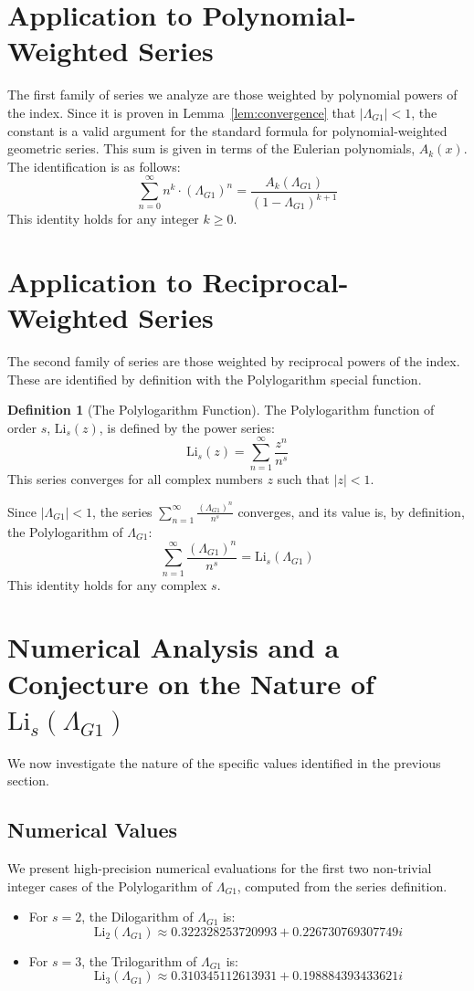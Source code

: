 \documentclass{amsart}
\theoremstyle{plain}
\theoremstyle{definition}
\newtheorem{definition}[theorem]{Definition}
\theoremstyle{remark}
\newcommand{\LambdaG}{\Lambda_{G1}}
\begin{document}
\section{Application to Polynomial-Weighted Series}
The first family of series we analyze are those weighted by polynomial powers of the index. Since it is proven in Lemma~\ref{lem:convergence} that $|\LambdaG|<1$, the constant is a valid argument for the standard formula for polynomial-weighted geometric series. This sum is given in terms of the Eulerian polynomials, $A_k(x)$.
The identification is as follows:
$$ \sum_{n=0}^{\infty} n^k \cdot (\LambdaG)^n = \frac{A_k(\LambdaG)}{(1-\LambdaG)^{k+1}} $$
This identity holds for any integer $k \ge 0$.

\section{Application to Reciprocal-Weighted Series}
The second family of series are those weighted by reciprocal powers of the index. These are identified by definition with the Polylogarithm special function.

\begin{definition}[The Polylogarithm Function]
The Polylogarithm function of order $s$, $\mathrm{Li}_s(z)$, is defined by the power series:
$$ \mathrm{Li}_s(z) = \sum_{n=1}^{\infty} \frac{z^n}{n^s} $$
This series converges for all complex numbers $z$ such that $|z|<1$.
\end{definition}

Since $|\LambdaG| < 1$, the series $\sum_{n=1}^{\infty} \frac{(\LambdaG)^{n}}{n^s}$ converges, and its value is, by definition, the Polylogarithm of $\LambdaG$:
$$ \sum_{n=1}^{\infty} \frac{(\LambdaG)^{n}}{n^s} = \mathrm{Li}_s(\LambdaG) $$
This identity holds for any complex $s$.

\section{Numerical Analysis and a Conjecture on the Nature of \texorpdfstring{$\mathrm{Li}_s(\LambdaG)$}{Li\_s(Lambda\_G1)}}
We now investigate the nature of the specific values identified in the previous section.

\subsection{Numerical Values}
We present high-precision numerical evaluations for the first two non-trivial integer cases of the Polylogarithm of $\LambdaG$, computed from the series definition.
\begin{itemize}
    \item For $s=2$, the Dilogarithm of $\LambdaG$ is:
    $$ \mathrm{Li}_2(\LambdaG) \approx 0.322328253720993 + 0.226730769307749i $$
    \item For $s=3$, the Trilogarithm of $\LambdaG$ is:
    $$ \mathrm{Li}_3(\LambdaG) \approx 0.310345112613931 + 0.198884393433621i $$
\end{itemize}
\end{document}
